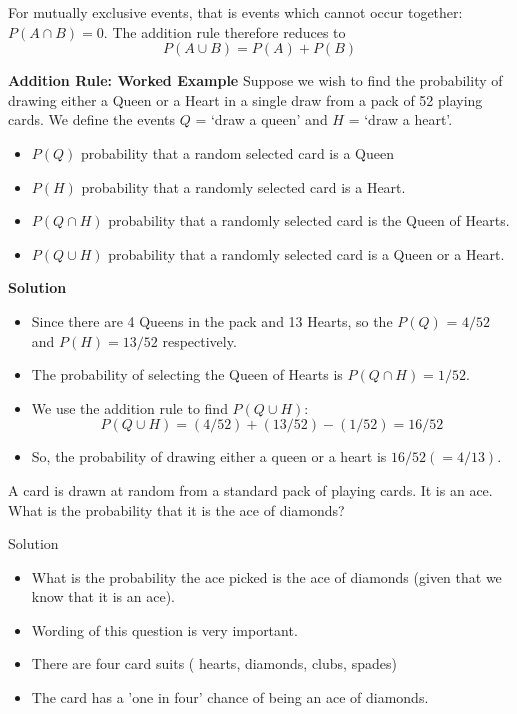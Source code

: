 For mutually exclusive events, that is events which cannot occur together:
$P(A\cap B) = 0$. The addition rule therefore reduces to
\[ P(A\cup B) = P(A) + P(B)\]

\textbf{Addition Rule: Worked Example}
Suppose we wish to find the probability of drawing either a Queen or a Heart
in a single draw from a pack of 52 playing cards. We define the events $Q$ =
`draw a queen' and $H$ = `draw a heart'.
\begin{itemize}
\item $P(Q)$ probability that a random selected card is a Queen
\item  $P(H)$ probability that a randomly selected card is a Heart.
\item  $P(Q\cap H)$ probability that a randomly selected card is the Queen of
Hearts.
\item  $P(Q\cup H)$ probability that a randomly selected card is a Queen or a Heart.
\end{itemize}




\noindent \textbf{Solution}
\begin{itemize} 
\item Since there are 4 Queens in the pack and 13 Hearts, so the $P(Q)$ = $4/52$
and $P(H) = 13/52$ respectively.
\item The probability of selecting the Queen of Hearts is $P(Q\cap H) = 1/52$.
\item We use the addition rule to find $P(Q\cup H)$:
\[ P(Q\cup H) = (4/52) + (13/52) - (1/52) = 16/52 \]
\item So, the probability of drawing either a queen or a heart is
$16/52 (= 4/13)$.
\end{itemize}
A card is drawn at random from a standard pack of playing cards. It is an ace. What is the probability that it is the ace of diamonds?


\begin{framed}
Solution

\begin{itemize}
\item What is the probability the ace picked is the ace of diamonds (given that we know that it is an ace). 

\item 
Wording of this question is very important.

\item 
There are four card suits ( hearts, diamonds, clubs, spades)

\item 
The card has a 'one in four' chance of being an ace of diamonds.
\end{itemize}
\end{framed}
